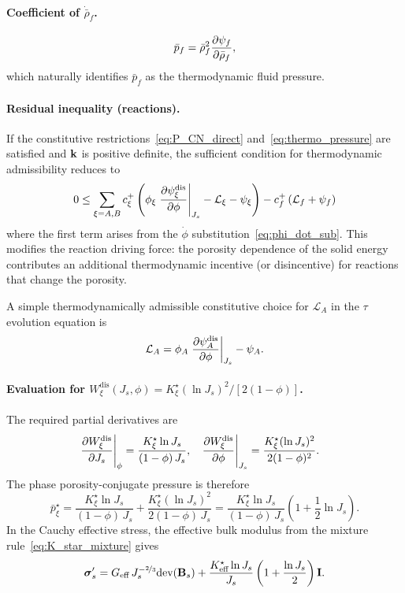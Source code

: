 \documentclass[11pt]{article}
\begin{document}
\paragraph{Coefficient of $\dot{\bar\rho}_f$.}
%
\begin{align}
  \bar{p}_f = \bar\rho_f^2 \frac{\partial \psi_f}{\partial \bar\rho_f},
  \label{eq:thermo_pressure}
\end{align}
%
which naturally identifies $\bar{p}_f$ as the thermodynamic fluid pressure.

\paragraph{Residual inequality (reactions).}  If the constitutive restrictions~\eqref{eq:P_CN_direct} and~\eqref{eq:thermo_pressure} are satisfied and $\mathbf{k}$ is positive definite, the sufficient condition for thermodynamic admissibility reduces to
%
\begin{align}
  0 \leq \sum_{\xi = A, B} c^{+}_\xi \left(\phi_\xi \left.\frac{\partial \psi^\text{dis}_\xi}{\partial \phi}\right\vert_{J_s} - \mathcal{L}_\xi - \psi_\xi\right) -c^{+}_f \left(\mathcal{L}_f + \psi_f\right) \notag
\end{align}
%
where the first term arises from the $\dot\phi$ substitution~\eqref{eq:phi_dot_sub}.  This modifies the reaction driving force: the porosity dependence of the solid energy contributes an additional thermodynamic incentive (or disincentive) for reactions that change the porosity.

A simple thermodynamically admissible constitutive choice for $\mathcal{L}_A$ in the $\tau$ evolution equation is
%
\begin{align}
 \mathcal{L}_A = \phi_A \left.\frac{\partial \psi^\text{dis}_A}{\partial \phi}\right\vert_{J_s} - \psi_A.
\end{align}

\paragraph{Evaluation for $W^{\text{dis}}_\xi(J_s, \phi) = K^\star_\xi (\ln J_s)^2 / [2(1-\phi)]$.}  The required partial derivatives are
%
\begin{align}
  \left.\frac{\partial W^{\text{dis}}_\xi}{\partial J_s}\right\vert_\phi &= \frac{K^\star_\xi \ln J_s}{(1-\phi)\,J_s}, &
  \left.\frac{\partial W^{\text{dis}}_\xi}{\partial \phi}\right\vert_{J_s} &= \frac{K^\star_\xi (\ln J_s)^2}{2(1-\phi)^2}.
  \notag
\end{align}
%
The phase porosity-conjugate pressure is therefore
%
\begin{equation}
  \bar{p}^\star_\xi = \frac{K^\star_\xi \ln J_s}{(1-\phi)\,J_s} + \frac{K^\star_\xi (\ln J_s)^2}{2(1-\phi)\,J_s} = \frac{K^\star_\xi \ln J_s}{(1-\phi)\,J_s}\left(1 + \frac{1}{2}\ln J_s\right).
  \label{eq:Pstar_explicit}
\end{equation}
%
In the Cauchy effective stress, the effective bulk modulus from the mixture rule~\eqref{eq:K_star_mixture} gives
%
\begin{equation}
  \boldsymbol{\sigma}'_s = G_{\text{eff}}\, J_s^{-\nicefrac{2}{3}} \mbox{dev}(\mathbf{B}_s) + \frac{K^\star_{\text{eff}} \ln J_s}{J_s}\left(1 + \frac{\ln J_s}{2}\right) \mathbf{I}.
  \label{eq:sigma_CN_explicit}
\end{equation}
\end{document}
